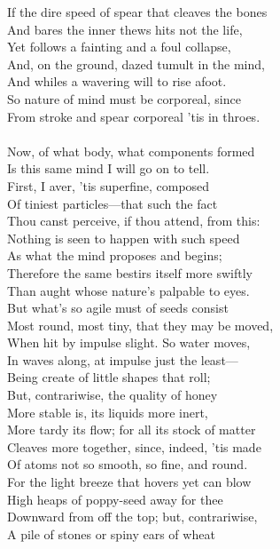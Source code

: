If the dire speed of spear that cleaves the bones\\
And bares the inner thews hits not the life,\\
Yet follows a fainting and a foul collapse,\\
And, on the ground, dazed tumult in the mind,\\
And whiles a wavering will to rise afoot.\\
So nature of mind must be corporeal, since\\
From stroke and spear corporeal 'tis in throes.\\
\\
Now, of what body, what components formed\\
Is this same mind I will go on to tell.\\
First, I aver, 'tis superfine, composed\\
Of tiniest particles—that such the fact\\
Thou canst perceive, if thou attend, from this:\\
Nothing is seen to happen with such speed\\
As what the mind proposes and begins;\\
Therefore the same bestirs itself more swiftly\\
Than aught whose nature's palpable to eyes.\\
But what's so agile must of seeds consist\\
Most round, most tiny, that they may be moved,\\
When hit by impulse slight. So water moves,\\
In waves along, at impulse just the least—\\
Being create of little shapes that roll;\\
But, contrariwise, the quality of honey\\
More stable is, its liquids more inert,\\
More tardy its flow; for all its stock of matter\\
Cleaves more together, since, indeed, 'tis made\\
Of atoms not so smooth, so fine, and round.\\
For the light breeze that hovers yet can blow\\
High heaps of poppy-seed away for thee\\
Downward from off the top; but, contrariwise,\\
A pile of stones or spiny ears of wheat\\
